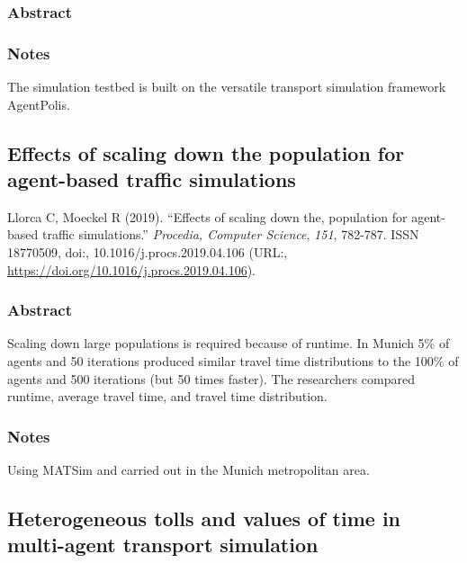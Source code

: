\documentclass[]{article}
\begin{document}
\hypertarget{abstract-13}{%
\subsubsection{Abstract}\label{abstract-13}}

\hypertarget{notes-13}{%
\subsubsection{Notes}\label{notes-13}}

The simulation testbed is built on the versatile transport simulation
framework AgentPolis.

\hypertarget{effects-of-scaling-down-the-population-for-agent-based-traffic-simulations}{%
\subsection{Effects of scaling down the population for agent-based
traffic
simulations}\label{effects-of-scaling-down-the-population-for-agent-based-traffic-simulations}}

Llorca C, Moeckel R (2019). ``Effects of scaling down the, population
for agent-based traffic simulations.'' \emph{Procedia, Computer
Science}, \emph{151}, 782-787. ISSN 18770509, doi:,
10.1016/j.procs.2019.04.106 (URL:,
\url{https://doi.org/10.1016/j.procs.2019.04.106}).

\hypertarget{abstract-14}{%
\subsubsection{Abstract}\label{abstract-14}}

Scaling down large populations is required because of runtime. In Munich
5\% of agents and 50 iterations produced similar travel time
distributions to the 100\% of agents and 500 iterations (but 50 times
faster). The researchers compared runtime, average travel time, and
travel time distribution.

\hypertarget{notes-14}{%
\subsubsection{Notes}\label{notes-14}}

Using MATSim and carried out in the Munich metropolitan area.

\hypertarget{heterogeneous-tolls-and-values-of-time-in-multi-agent-transport-simulation}{%
\subsection{Heterogeneous tolls and values of time in multi-agent
transport
simulation}\label{heterogeneous-tolls-and-values-of-time-in-multi-agent-transport-simulation}}
\end{document}
